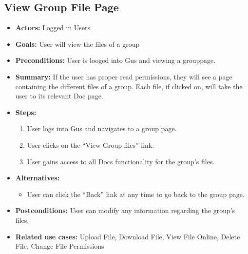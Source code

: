 \subsection{View Group File Page}
  \begin{itemize}
          \item{\textbf{Actors:} Logged in Users}
          \item{\textbf{Goals:} User will view the files of a group}
          \item{\textbf{Preconditions:} User is looged into Gus and viewing a grouppage.}
          \item{\textbf{Summary:} If the user has proper read permissions, they will see a page containing the different files of a group. Each file, if clicked on, will take the user to its relevant Doc page.}
	  \item{\textbf{Steps:}}
	  \begin{enumerate}
	       \item{User logs into Gus and navigates to a group page.}
	       \item{User clicks on the ``View Group files'' link.}
	       \item{User gains access to all Docs functionality for the group's files.}
	  \end{enumerate}
	  \item{\textbf{Alternatives:}}
	  \begin{itemize}
	       \item{User can click the ``Back'' link at any time to go back to the group page.}
	  \end{itemize}
	  \item{\textbf{Postconditions:} User can modify any information regarding the group's files.}
	  \item{\textbf{Related use cases:} Upload File, Download File, View File Online, Delete File, Change File Permissions}
     \end{itemize}
